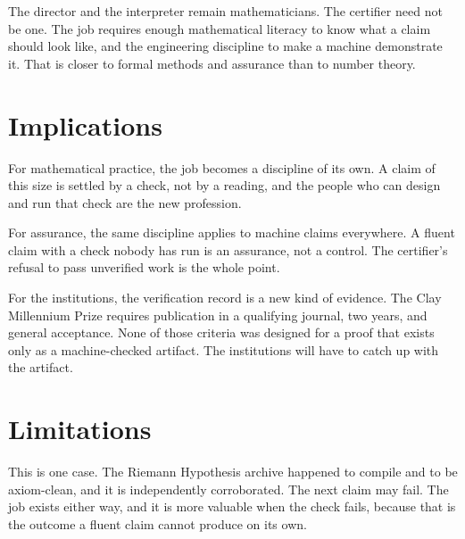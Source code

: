 \documentclass[11pt]{article}
\begin{document}
The director and the interpreter remain mathematicians. The certifier need not be one. The job requires enough mathematical literacy to know what a claim should look like, and the engineering discipline to make a machine demonstrate it. That is closer to formal methods and assurance than to number theory.

\section{Implications}
For mathematical practice, the job becomes a discipline of its own. A claim of this size is settled by a check, not by a reading, and the people who can design and run that check are the new profession.

For assurance, the same discipline applies to machine claims everywhere. A fluent claim with a check nobody has run is an assurance, not a control. The certifier's refusal to pass unverified work is the whole point.

For the institutions, the verification record is a new kind of evidence. The Clay Millennium Prize requires publication in a qualifying journal, two years, and general acceptance. None of those criteria was designed for a proof that exists only as a machine-checked artifact. The institutions will have to catch up with the artifact.

\section{Limitations}
This is one case. The Riemann Hypothesis archive happened to compile and to be axiom-clean, and it is independently corroborated. The next claim may fail. The job exists either way, and it is more valuable when the check fails, because that is the outcome a fluent claim cannot produce on its own.
\end{document}
